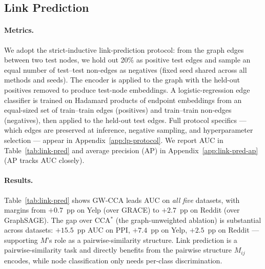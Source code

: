 \documentclass{article}
\begin{document}
\subsection{Link Prediction}
\paragraph{Metrics.}
We adopt the strict-inductive link-prediction protocol: from the graph
edges between two test nodes, we hold out 20\% as positive test edges
and sample an equal number of test--test non-edges as negatives (fixed
seed shared across all methods and seeds). The encoder is applied to the
graph with the held-out positives removed to produce test-node
embeddings. A logistic-regression edge classifier is trained on Hadamard
products of endpoint embeddings from an equal-sized set of train--train
edges (positives) and train--train non-edges (negatives), then applied
to the held-out test edges. Full protocol specifics --- which edges are
preserved at inference, negative sampling, and hyperparameter selection
--- appear in Appendix~\ref{app:lp-protocol}. We report AUC in
Table~\ref{tab:link-pred} and average precision (AP) in
Appendix~\ref{app:link-pred-ap} (AP tracks AUC closely).

\paragraph{Results.}
Table~\ref{tab:link-pred} shows GW-CCA leads AUC on \emph{all five}
datasets, with margins from $+0.7$~pp on Yelp (over GRACE) to $+2.7$~pp
on Reddit (over GraphSAGE). The gap over CCA$^\ast$ (the graph-unweighted
ablation) is substantial across datasets:
$+15.5$~pp AUC on PPI, $+7.4$~pp on Yelp, $+2.5$~pp on Reddit --- supporting
$M$'s role as a pairwise-similarity structure. Link
prediction is a pairwise-similarity task and directly benefits from the
pairwise structure $M_{ij}$ encodes, while node classification only
needs per-class discrimination.
\end{document}
